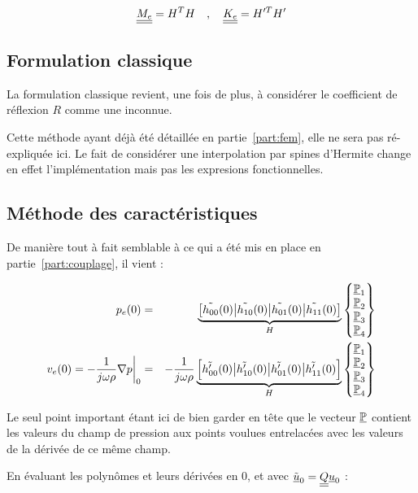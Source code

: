 \begin{equation*}
	\underline{\underline{M_e}} = H^TH \quad,\quad \underline{\underline{K_e}} = H'^TH'
\end{equation*}

\subsection{Formulation classique}

La formulation classique revient, une fois de plus, à considérer le coefficient de réflexion $R$ comme une inconnue.

Cette méthode ayant déjà été détaillée en partie~\ref{part:fem}, elle ne sera pas ré-expliquée ici. Le fait de
considérer une interpolation par spines d'Hermite change en effet l'implémentation mais pas les expresions
fonctionnelles.

\subsection{Méthode des caractéristiques}

De manière tout à fait semblable à ce qui a été mis en place en partie~\ref{part:couplage}, il vient :

\begin{eqnarray*}
	p_e(0) & = & \underbrace{\left[\tilde{h_{00}}(0)\big|\tilde{h_{10}}(0)\big|\tilde{h_{01}}(0)\big|\tilde{h_{11}}(0)\right]}_{H}\begin{Bmatrix}\underline{\mathbb{P}}_1\\\underline{\mathbb{P}}_2\\\underline{\mathbb{P}}_3\\\underline{\mathbb{P}}_4\end{Bmatrix}\\
	v_e(0) = -\frac{1}{j\omega\rho}\nabla p\bigg|_0& = & -\frac{1}{j\omega\rho}\underbrace{\left[\tilde{h'_{00}}(0)\big|\tilde{h'_{10}}(0)\big|\tilde{h'_{01}}(0)\big|\tilde{h'_{11}}(0)\right]}_{H}\begin{Bmatrix}\underline{\mathbb{P}}_1\\\underline{\mathbb{P}}_2\\\underline{\mathbb{P}}_3\\\underline{\mathbb{P}}_4\end{Bmatrix}
\end{eqnarray*}

Le seul point important étant ici de bien garder en tête que le vecteur $\underline{\mathbb{P}}$ contient les valeurs du champ de pression
aux points voulues entrelacées avec les valeurs de la dérivée de ce même champ.

En évaluant les polynômes et leurs dérivées en $0$, et avec $\tilde{\underline{u}}_0 = \underline{\underline{Q}}\underline{u}_0$ :

